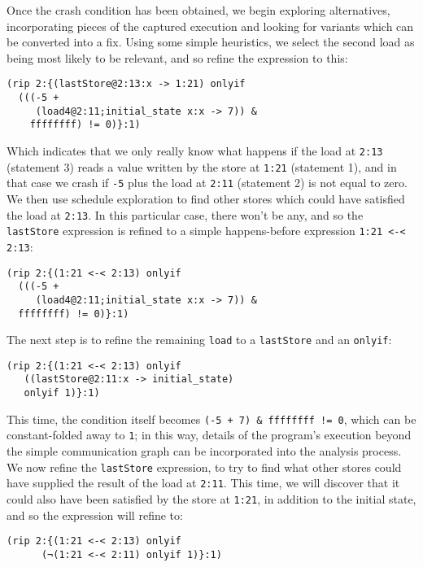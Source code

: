 \documentclass[10pt,a4paper,twocolumn]{article}
\begin{document}
Once the crash condition has been obtained, we begin exploring
alternatives, incorporating pieces of the captured execution and
looking for variants which can be converted into a fix.  Using some
simple heuristics, we select the second load as being most likely to
be relevant, and so refine the expression to this:

\begin{verbatim}
(rip 2:{(lastStore@2:13:x -> 1:21) onlyif
  (((-5 +
     (load4@2:11;initial_state x:x -> 7)) &
    ffffffff) != 0)}:1)
\end{verbatim}

Which indicates that we only really know what happens if the load at
\verb|2:13| (statement 3) reads a value written by the store at
\verb|1:21| (statement 1), and in that case we crash if \verb|-5| plus
the load at \verb|2:11| (statement 2) is not equal to zero.  We then
use schedule exploration to find other stores which could have
satisfied the load at \verb|2:13|.  In this particular case, there
won't be any, and so the \verb|lastStore| expression is refined to a
simple happens-before expression \verb|1:21 <-< 2:13|:

\begin{verbatim}
(rip 2:{(1:21 <-< 2:13) onlyif
  (((-5 +
     (load4@2:11;initial_state x:x -> 7)) &
  ffffffff) != 0)}:1)
\end{verbatim}

The next step is to refine the remaining \verb|load| to a
\verb|lastStore| and an \verb|onlyif|:

\begin{verbatim}
(rip 2:{(1:21 <-< 2:13) onlyif
   ((lastStore@2:11:x -> initial_state)
   onlyif 1)}:1)
\end{verbatim}

This time, the condition itself becomes
\verb|(-5 + 7) & ffffffff != 0|, which can be constant-folded away to
\verb|1|; in this way, details of the program's execution beyond the
simple communication graph can be incorporated into the analysis
process.  We now refine the \verb|lastStore| expression, to try to
find what other stores could have supplied the result of the load at
\verb|2:11|.  This time, we will discover that it could also have been
satisfied by the store at \verb|1:21|, in addition to the initial
state, and so the expression will refine to:

\begin{verbatim}
(rip 2:{(1:21 <-< 2:13) onlyif
      (¬(1:21 <-< 2:11) onlyif 1)}:1)
\end{verbatim}
\end{document}
